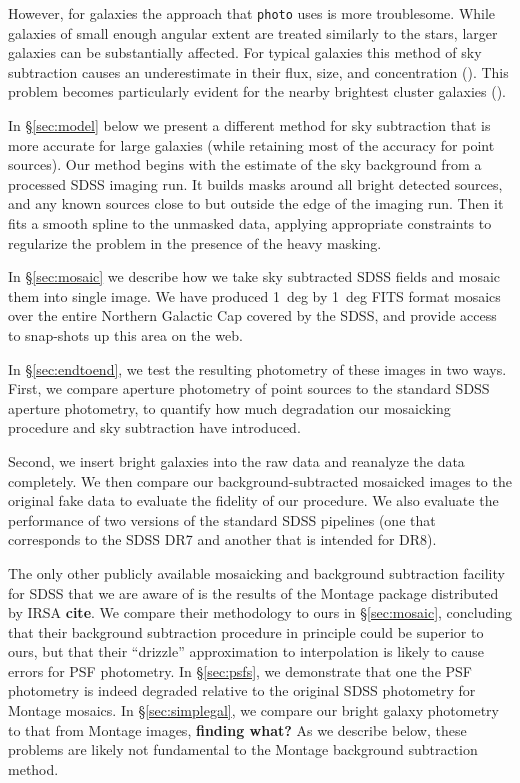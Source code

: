 \documentclass[10pt,preprint]{aastex}
\begin{document}
However, for galaxies the approach that {\tt photo} uses is more
troublesome.  While galaxies of small enough angular extent are
treated similarly to the stars, larger galaxies can be substantially
affected. For typical galaxies this method of sky subtraction causes
an underestimate in their flux, size, and concentration
(\cite{blanton05b}). This problem becomes particularly evident for the
nearby brightest cluster galaxies (\citealt{bernardi07a,
lauer07a}). 

In \S\ref{sec:model} below we present a different method for sky
subtraction that is more accurate for large galaxies (while retaining
most of the accuracy for point sources). Our method begins with the
estimate of the sky background from a processed SDSS imaging run.  It
builds masks around all bright detected sources, and any known sources
close to but outside the edge of the imaging run. Then it fits a
smooth spline to the unmasked data, applying appropriate constraints
to regularize the problem in the presence of the heavy masking. 

In \S\ref{sec:mosaic} we describe how we take sky subtracted SDSS
fields and mosaic them into single image. We have produced 1~deg by
1~deg FITS format mosaics over the entire Northern Galactic Cap
covered by the SDSS, and provide access to snap-shots up this area on
the web.  

In \S\ref{sec:endtoend}, we test the resulting photometry of these images
in two ways.  First, we compare aperture photometry of point sources
to the standard SDSS aperture photometry, to quantify how much
degradation our mosaicking procedure and sky subtraction have
introduced.

Second, we insert bright galaxies into the raw data and reanalyze the
data completely.  We then compare our background-subtracted mosaicked
images to the original fake data to evaluate the fidelity of our
procedure. We also evaluate the performance of two versions of the
standard SDSS pipelines (one that corresponds to the SDSS DR7 and
another that is intended for DR8).

The only other publicly available mosaicking and background
subtraction facility for SDSS that we are aware of is the results of
the Montage package distributed by IRSA {\bf cite}. We compare their
methodology to ours in \S\ref{sec:mosaic}, concluding that their
background subtraction procedure in principle could be superior to
ours, but that their ``drizzle'' approximation to interpolation is
likely to cause errors for PSF photometry. In \S\ref{sec:psfs}, we
demonstrate that one the PSF photometry is indeed degraded relative to
the original SDSS photometry for Montage mosaics. In
\S\ref{sec:simplegal}, we compare our bright galaxy photometry to that
from Montage images, {\bf finding what?}  As we describe below, these
problems are likely not fundamental to the Montage background
subtraction method.
\end{document}
